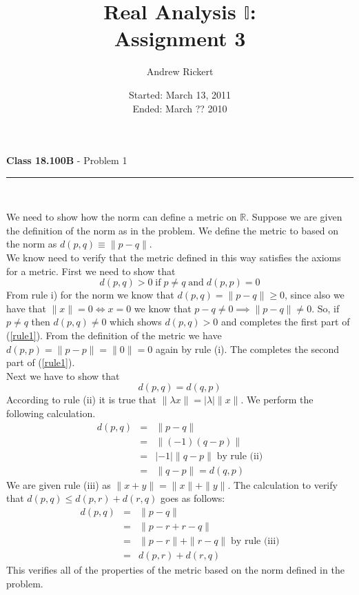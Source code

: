 \documentclass[11pt,reqno]{article}
\title{Real Analysis $\mathbb{I}$: \\ Assignment 3}
\author{Andrew Rickert}
\date{Started: March 13, 2011 \\ \hspace{1pt} Ended: March ??  2010}                                           %
\begin{document}
\maketitle


\begin{flushleft} 
\textbf{Class 18.100B} - Problem 1\\
\rule{500pt}{1pt}\\
\end{flushleft} 

We need to show how the norm can define a metric on $\mathbb{R}$. Suppose we are given the definition of the norm as in the problem. We define the metric to based on the norm as $d(p,q) \equiv \|p-q\|$.\\
\indent We know need to verify that the metric defined in this way satisfies the axioms for a metric.
First we need to show that 
\begin{equation}
d(p,q) > 0 \; \text{if} \; p \neq q \; \text{and} \; d(p,p) = 0 \label{rule1}
\end{equation} 
From rule i) for the norm we know that $d(p,q) = \|p-q\| \ge 0$,  since also we have that $\|x\| = 0 \iff x = 0$ we know that $p-q \ne 0 \implies \|p-q\| \neq 0$. So, if $p \neq q$ then $d(p,q) \neq 0$ which shows $d(p,q) > 0$ and completes the first part of (\ref{rule1}). From the definition of the metric we have $d(p,p) = \|p - p\| = \| 0 \| = 0$ again by rule (i). The completes the second part of (\ref{rule1}).\\
\indent Next we have to show that 
\begin{equation}
d(p,q) = d(q,p) \label{rule2}
\end{equation} 
According to rule (ii) it is true that $\| \lambda x \| = |\lambda| \|x \|$. We perform the following calculation.
\begin{eqnarray*}
d(p,q) & = & \| p - q \| \\
            & = & \| (-1) (q - p) \| \\
            & = & |-1| \|q - p\| \; \text{by rule (ii)} \\
            & = & \| q - p \| = d(q,p)
\end{eqnarray*}
We are given rule (iii) as $\| x+ y \| =  \| x \|  +  \| y \|$. The calculation to verify that $d(p,q) \le d(p,r) + d(r,q)$ goes as follows:
\begin{eqnarray*}
d(p,q) & = & \| p - q \| \\
	  & = & \| p - r + r - q \| \\
	  & = & \| p - r \| + \| r - q \| \; \text{by rule (iii)} \\
	  & = & d(p,r) + d(r,q)
\end{eqnarray*}
This verifies all of the properties of the metric based on the norm defined in the problem.
\end{document}
